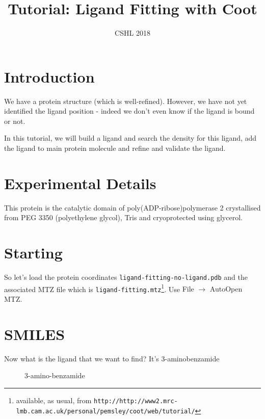 \documentclass{article}
\title{Tutorial: Ligand Fitting with Coot}
\author{CSHL 2018}
\begin{document}
\maketitle
 

\section{Introduction}

We have a protein structure (which is well-refined). However, we have
not yet identified the ligand position - indeed we don't even know if
the ligand is bound or not.  

In this tutorial, we will build a ligand
and search the density for this ligand, add the ligand to main protein
molecule and refine and validate the ligand.

\section{Experimental Details}

 This protein is the catalytic domain of poly(ADP-ribose)polymerase 2
 crystallised from PEG 3350 (polyethylene glycol), Tris and
 cryoprotected using glycerol.

\section{Starting}

 So let's load the protein coordinates
 \texttt{ligand-fitting-no-ligand.pdb} and the associated MTZ file
 which is \texttt{ligand-fitting.mtz}\footnote{available, as usual, 
from \texttt{\small http://http://www2.mrc-lmb.cam.ac.uk/personal/pemsley/coot/web/tutorial/}}.
Use \textsf{File $\rightarrow$ AutoOpen MTZ}.

\section{SMILES}

 Now what is the ligand that we want to find? It's 3-aminobenzamide

\begin{figure}[htbp]
  \begin{center}
    \leavevmode
    \epsfxsize 30mm
    \caption{3-amino-benzamide}{}
    \label{fig:3-amino-benzamide}
  \end{center}
\end{figure}
\end{document}
